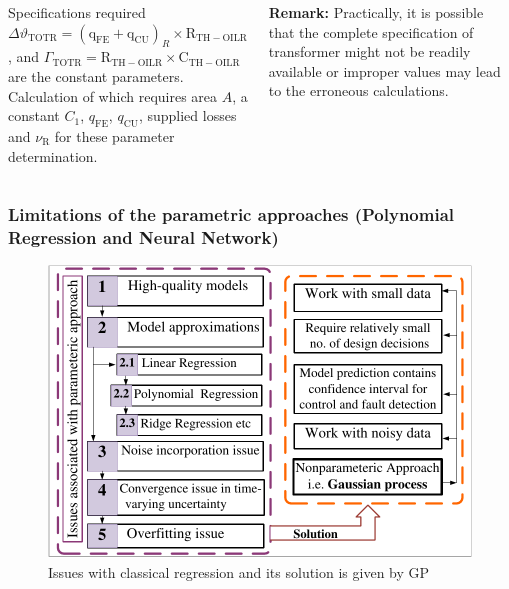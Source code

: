 \documentclass[10pt,hyperref={pdfpagelabels=false}]{beamer}
\begin{document}
\begin{frame}[fragile]
\begin{columns}
\begin{alertblock}{Specifications required}
    $ \Delta \vartheta_{\mathrm{TOTR}}=(\mathrm{q}_{\mathrm{FE}}+\mathrm{q}_{\mathrm{CU}})_R\times \mathrm{R}_{\mathrm{TH-OILR}}$, 
 and 
 $\Gamma_{\mathrm{TOTR}}=\mathrm{R}_{\mathrm{TH-OILR}} \times \mathrm{C}_{\mathrm{TH-OILR}}$\\
are the constant parameters. Calculation of which requires area $A$, a constant $C_1$, $q_{\mathrm{FE}}$, $q_{\mathrm{CU}}$, supplied losses and $\nu_\mathrm{R}$ for these parameter determination.


\end{alertblock}
\begin{exampleblock}{\textbf{Remark:}}
\scriptsize
Practically, it is possible that the complete specification of transformer might not be readily available or improper values may lead to the erroneous calculations.
\end{exampleblock}
\end{columns}



\end{frame}

\begin{frame}[fragile]
\frametitle{Limitations of the parametric approaches  (Polynomial Regression and Neural Network)}
\begin{figure}
    \centering
    \includegraphics[scale=0.6]{Images/pdfresizer.com-pdf-crop (12).pdf}
    \caption{Issues with classical regression and its solution is given by GP}
    \label{fig:Problem_5_1_1}
\end{figure}

\end{frame}
\end{document}
